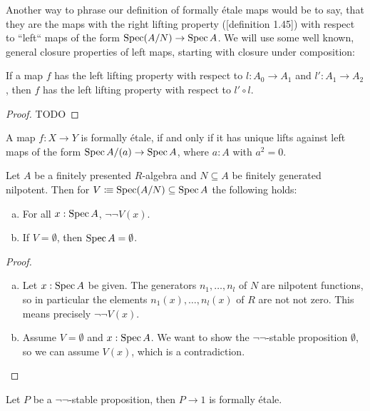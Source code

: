 Another way to phrase our definition of formally étale maps would be to say,
that they are the maps with the right lifting property (\cite{modalities}[definition 1.45]) with respect to ``left`` maps of the form $\operatorname{Spec} (A/N)\to \operatorname{Spec} A$.
We will use some well known, general closure properties of left maps, starting with closure under composition:

\begin{lemma}%
  If a map $f$ has the left lifting property with respect to $l:A_0\to A_1$ and $l':A_1\to A_2$,
  then $f$ has the left lifting property with respect to $l'\circ l$.
\end{lemma}

\begin{proof}
  TODO
\end{proof}

\begin{lemma}%
  A map $f:X\to Y$ is formally étale,
  if and only if it has unique lifts against left maps of the form $\operatorname{Spec} A/(a)\to \operatorname{Spec} A$,
  where $a:A$ with $a^2=0$.
\end{lemma}

\begin{lemma}%
  \label{nilpotent-ideal-not-not-dense}
  Let $A$ be a finitely presented $R$-algebra and $N\subseteq A$ be finitely generated nilpotent.
  Then for $V\vcentcolon\mspace{-1.2mu}\equiv \operatorname{Spec} (A/N)\subseteq \operatorname{Spec} A$ the following holds:
  \begin{enumerate}[(a)]
  \item For all $x:\operatorname{Spec} A$, $\neg\neg V(x)$.
  \item If $V=\emptyset$, then $\operatorname{Spec} A=\emptyset$.
  \end{enumerate}
\end{lemma}

\begin{proof}
  \begin{enumerate}[(a)]
  \item
    Let $x : \operatorname{Spec} A$ be given.
    The generators $n_1,\dots,n_l$ of $N$ are nilpotent functions,
    so in particular the elements $n_1(x), \dots, n_l(x)$ of $R$
    are not not zero.
    This means precisely $\neg\neg V(x)$.
  \item Assume $V=\emptyset$ and $x:\operatorname{Spec} A$.
        We want to show the $\neg\neg$-stable proposition $\emptyset$,
        so we can assume $V(x)$, which is a contradiction.
  \end{enumerate}
\end{proof}

\begin{proposition}%
  Let $P$ be a $\neg\neg$-stable proposition,
  then $P\to 1$ is formally étale.
\end{proposition}

